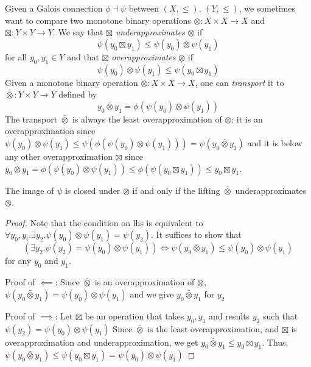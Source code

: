 \documentclass{llncs}
\begin{document}
Given a Galois connection $\phi \dashv \psi$ between $(X, \leq)$,
$(Y, \leq)$, we sometimes want to compare two monotone binary
operations ${\otimes} : X \times X \to X$ and
${\boxtimes} : Y \times Y \to Y$. We say that $\boxtimes$
\emph{underapproximates} $\otimes$ if
\[
\psi(y_0 \boxtimes y_1) \leq \psi(y_0) \otimes \psi(y_1) 
\]  
for all $y_0, y_1 \in Y$ and that $\boxtimes$ \emph{overapproximates}
$\otimes$ if
\[
\psi(y_0) \otimes \psi(y_1) \leq \psi(y_0 \boxtimes y_1) 
\]  
Given a monotone binary operation $\otimes : X \times X \to X$, one
can \emph{transport} it to $\bar{\otimes} : Y \times Y \to Y$ defined
by
\[
y_0 \mathbin{\bar{\otimes}} y_1 = \phi(\psi(y_0) \otimes \psi(y_1)) 
\]
The transport $\bar{\otimes}$ is always the least overapproximation of
$\otimes$: it is an overapproximation since
$\psi(y_0) \otimes \psi(y_1) \leq \psi(\phi(\psi(y_0) \otimes
\psi(y_1))) = \psi(y_0 \mathbin{\bar{\otimes}} y_1)$ and it is below
any other overapproximation ${\boxtimes}$ since
$y_0 \mathbin{\bar{\otimes}} y_1 = \phi(\psi(y_0) \otimes \psi(y_1))
\leq \phi(\psi(y_0 \boxtimes y_1)) \leq y_0 \boxtimes y_1$.
\begin{proposition}
  The image of $\psi$ is closed under $\otimes$ if and only if the lifting $\bar{\otimes}$ underapproximates $\otimes$.
  \begin{proof}
    Note that the condition on lhs is equivalent to $\forall y_{0}, y_{i}. \exists y_{2}. \psi(y_{0}) \otimes \psi (y_{1}) = \psi (y_{2})$.
    It suffices to show that
    \[
      (\exists y_{2}. \psi (y_{2}) = \psi(y_{0}) \otimes \psi (y_{1}) ) \iff \psi (y_{0} \bar{\otimes} y_{1}) \leq \psi (y_{0}) \otimes \psi (y_{1})
    \]
    for any $y_{0}$ and $y_{1}$.

    Proof of $\impliedby$: Since $\bar{\otimes}$ is an overapproximation of $\otimes$,
    $\psi (y_{0} \bar{\otimes} y_{1}) = \psi (y_{0}) \otimes \psi (y_{1})$ and we give $y_{0} \bar{\otimes} y_{1}$ for $y_{2}$

    Proof of $\implies$:
    Let $\boxtimes$ be an operation that takes $y_{0}, y_{1}$ and results $y_{2}$ such that $\psi(y_{2}) = \psi(y_{0}) \otimes \psi(y_{1})$
    Since $\bar{\otimes}$ is the least overapproximation, and $\boxtimes$ is overapproximation and underapproximation, we get
    $y_{0} \bar{\otimes} y_{1} \leq y_{0} \boxtimes y_{1} $. Thus, $\psi(y_{0} \bar{\otimes} y_{1}) \leq \psi(y_{0} \boxtimes y_{1}) = \psi(y_{0}) \otimes \psi (y_{1})$
  \end{proof}
\end{proposition}
\end{document}
